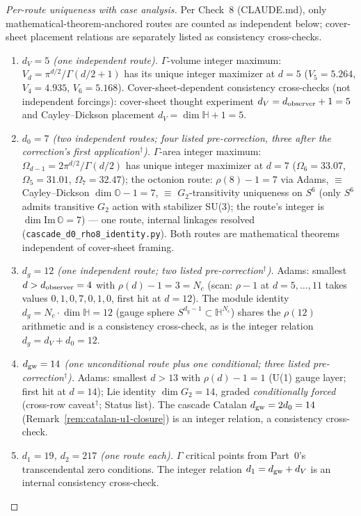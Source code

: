 \documentclass[12pt,a4paper]{article}
\begin{document}
\begin{proof}[Per-route uniqueness with case analysis]
Per Check~8 (CLAUDE.md), only mathematical-theorem-anchored routes are counted as independent below; cover-sheet placement relations are separately listed as consistency cross-checks.
\begin{enumerate}[nosep]
\item \emph{$d_V = 5$ (one independent route).} $\Gamma$-volume integer maximum: $V_d = \pi^{d/2}/\Gamma(d/2+1)$ has its unique integer maximizer at $d=5$ ($V_5 = 5.264$, $V_4 = 4.935$, $V_6 = 5.168$). Cover-sheet-dependent consistency cross-checks (not independent forcings): cover-sheet thought experiment $d_V = d_{\rm observer}+1 = 5$ and Cayley--Dickson placement $d_V = \dim\mathbb{H}+1 = 5$.
\item \emph{$d_0 = 7$ (two independent routes; four listed pre-correction, three after the correction's first application$^{\dagger}$).} $\Gamma$-area integer maximum: $\Omega_{d-1} = 2\pi^{d/2}/\Gamma(d/2)$ has unique integer maximizer at $d=7$ ($\Omega_6 = 33.07$, $\Omega_5 = 31.01$, $\Omega_7 = 32.47$); the octonion route: $\rho(8)-1 = 7$ via Adams, $\equiv$ Cayley--Dickson $\dim\mathbb{O}-1 = 7$, $\equiv$ $G_2$-transitivity uniqueness on $S^6$ (only $S^6$ admits transitive $G_2$ action with stabilizer SU(3); the route's integer is $\dim\mathrm{Im}\,\mathbb{O} = 7$) --- one route, internal linkages resolved (\texttt{cascade\_d0\_rho8\_identity.py}). Both routes are mathematical theorems independent of cover-sheet framing.
\item \emph{$d_g = 12$ (one independent route; two listed pre-correction$^{\dagger}$).} Adams: smallest $d > d_{\rm observer} = 4$ with $\rho(d)-1 = 3 = N_c$ (scan: $\rho-1$ at $d=5,\ldots,11$ takes values $0,1,0,7,0,1,0$, first hit at $d=12$). The module identity $d_g = N_c\cdot\dim\mathbb{H} = 12$ (gauge sphere $S^{d_g-1}\subset\mathbb{H}^{N_c}$) shares the $\rho(12)$ arithmetic and is a consistency cross-check, as is the integer relation $d_g = d_V + d_0 = 12$.
\item \emph{$d_{\rm gw} = 14$ (one unconditional route plus one conditional; three listed pre-correction$^{\dagger}$).} Adams: smallest $d > 13$ with $\rho(d)-1 = 1$ (U(1) gauge layer; first hit at $d=14$); Lie identity $\dim G_2 = 14$, graded \emph{conditionally forced} (cross-row caveat$^{\dagger}$; Status list). The cascade Catalan $d_{\rm gw} = 2 d_0 = 14$ (Remark~\ref{rem:catalan-u1-closure}) is an integer relation, a consistency cross-check.
\item \emph{$d_1 = 19$, $d_2 = 217$ (one route each).} $\Gamma$ critical points from Part~0's transcendental zero conditions. The integer relation $d_1 = d_{\rm gw} + d_V$ is an internal consistency cross-check.

\end{enumerate}
\end{proof}
\end{document}
